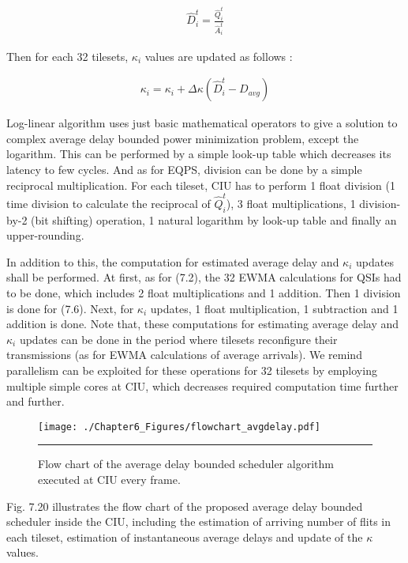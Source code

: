 \begin{align}
{{\hat{D}}_{i}^{t}} = \frac{{{\hat{Q}}_{i}^{t}}} {{{\hat{A}}_{i}^{t}}} 
\end{align}

Then for each 32 tilesets, $\kappa_{i}$ values are updated as follows :

\begin{align}
\kappa_{i} =\kappa_{i} + \Delta \kappa ({{\hat{D}}_{i}^{t}}-D_{avg})
\end{align}

Log-linear algorithm uses just basic mathematical operators to give a solution to complex average delay bounded power minimization problem, except the logarithm. This can be performed by a simple look-up table which decreases its latency to few cycles. And as for EQPS, division can be done by a simple reciprocal multiplication. For each tileset, CIU has to perform 1 float division (1 time division to calculate the reciprocal of ${{\hat{Q}}_{i}^{t}}$), 3 float multiplications, 1 division-by-2 (bit shifting) operation, 1 natural logarithm by look-up table and finally an upper-rounding. 

In addition to this, the computation for estimated average delay and $\kappa_{i}$ updates shall be performed. At first, as for (7.2), the 32 EWMA calculations for QSIs had to be done, which includes 2 float multiplications and 1 addition. Then 1 division is done for (7.6). Next, for $\kappa_{i}$ updates, 1 float multiplication, 1 subtraction and 1 addition is done. Note that, these computations for estimating average delay and $\kappa_{i}$ updates can be done in the period where tilesets reconfigure their transmissions (as for EWMA calculations of average arrivals). We remind parallelism can be exploited for these operations for 32 tilesets by employing multiple simple cores at CIU, which decreases required computation time further and further.

\begin{figure}[htbp]
  \centering
    \texttt{[image: ./Chapter6\_Figures/flowchart\_avgdelay.pdf]}
    \rule{35em}{0.5pt}
  \caption[Flow chart of the average delay bounded scheduler algorithm executed at CIU every frame.]{Flow chart of the average delay bounded scheduler algorithm executed at CIU every frame.} 
  \label{fig:Electron}
\end{figure}

Fig. 7.20 illustrates the flow chart of the proposed average delay bounded scheduler inside the CIU, including the estimation of arriving number of flits in each tileset, estimation of instantaneous average delays and update of the $\kappa$ values. 





